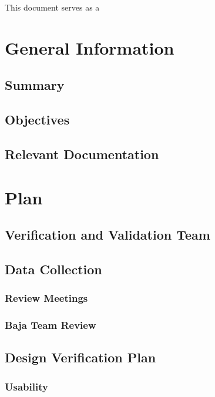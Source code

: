 \documentclass[12pt, titlepage]{article}
\begin{document}
\newpage


\noindent This document serves as a 
\section{General Information}

\subsection{Summary}

\subsection{Objectives}

\subsection{Relevant Documentation}

\section{Plan}

\subsection{Verification and Validation Team}
    
\subsection{Data Collection}


\subsubsection*{Review Meetings}

\subsubsection*{Baja Team Review}


\subsection{Design Verification Plan}

\subsubsection{Usability}
\end{document}
